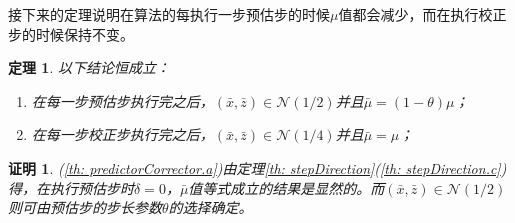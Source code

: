 \documentclass{ctexart}
\numberwithin{equation}{section} %
\newtheorem{theorem}{定理}[section]
\newtheorem*{Proof}{证明}
\begin{document}
接下来的定理说明在算法的每执行一步预估步的时候$ \mu $值都会减少，而在执行校正步的时候保持不变。
\begin{theorem}
	\label{th: predictorCorrector}
	以下结论恒成立：
	\begin{enumerate}[(1)]
		\item \label{th: predictorCorrector.a} 在每一步预估步执行完之后，$ \left(\bar{x}, \bar{z}\right) \in \mathcal{N}\left(1/2\right) $并且$ \bar{\mu} = \left(1 - \theta\right)\mu $；
		\item \label{th: predictorCorrector.b} 在每一步校正步执行完之后，$ \left(\bar{x}, \bar{z}\right) \in \mathcal{N}\left(1/4\right) $并且$ \bar{\mu} = \mu $；
	\end{enumerate}
\end{theorem}
\begin{Proof}
	(\ref{th: predictorCorrector.a})由定理\ref{th: stepDirection}(\ref{th: stepDirection.c})得，在执行预估步时$ \delta = 0 $，$ \bar{\mu} $值等式成立的结果是显然的。而$ \left(\bar{x}, \bar{z}\right) \in \mathcal{N}\left(1/2\right) $则可由预估步的步长参数$ \theta $的选择确定。
	

\end{Proof}
\end{document}
